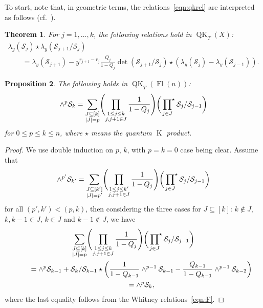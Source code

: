 \documentclass[pdftex]{sigma}
\numberwithin{equation}{section}
\newtheorem{Theorem}{Theorem}[section]
\newtheorem{Proposition}[Theorem]{Proposition}
\theoremstyle{definition}
\DeclareMathOperator{\Fl}{Fl}
\DeclareMathOperator{\QK}{QK}
\DeclareMathOperator{\K}{K}
\newcommand{\cS}{{\mathcal S}}
\begin{document}
To start, note that, in geometric terms, the relations~\eqref{eqn:qkrel} are interpreted as follows
(cf.~\cite{gu2023quantum,GMSXZZ:QKW,huq2024quantum}).

\begin{Theorem}%
 For $j=1,\dots, k$, the following relations hold in $\QK_T(X)$:
 \begin{gather}
 \lambda_y(\cS_{j})\star\lambda_y(\cS_{{j+1}}/\cS_{j})\nonumber\\
 \qquad{}=\lambda_y(\cS_{{j+1}})-y^{r_{j+1}-r_j}\frac{Q_j}{1-Q_j}\det(\cS_{{j+1}}/\cS_{j})\star(\lambda_y(\cS_{j})-\lambda_y(\cS_{{j-1}})).\label{eqn:lambda_y_rel}
 \end{gather}
\end{Theorem}
\begin{Proposition}\label{prop:F}
 The following holds in $\QK_T(\Fl(n))$:
 \begin{gather}\label{eqn:F}
 \wedge^{p}\cS_k =\sum_{\substack{J\subseteq[k]\\|J|=p}}\Biggl(\prod_{\substack{1\leq j\leq k\\j,j+1\in J}}\frac{1}{1-Q_j}\Biggr)\biggl(\sideset{}{^\star}\prod_{j\in J}\cS_{j}/\cS_{j-1}\biggr)
 \end{gather}
 for $0\leq p\leq k\leq n$, where $\star$ means the quantum $\K$ product.
\end{Proposition}
\begin{proof}
 We use double induction on $p$, $k$, with $p=k=0$ case being clear. Assume that
 \begin{gather*}
 \wedge^{p'}\cS_{k'} =\sum_{\substack{J\subseteq[k']\\|J|=p'}}\Biggl(\prod_{\substack{1\leq j\leq k'\\j,j+1\in J}}\frac{1}{1-Q_j}\Biggr)\biggl(\sideset{}{^\star}\prod_{j\in J}\cS_{j}/\cS_{j-1}\biggr)
 \end{gather*}
 for all $(p',k')<(p,k)$, then considering the three cases for $J\subseteq [k]$: $k\notin J$, $k,k-1\in J$, $k\in J$ and $k-1\notin J$, we have
 \begin{gather*}
 \sum_{\substack{J\subseteq[k]\\|J|=p}}\Biggl(\prod_{\substack{1\leq j\leq k\\j,j+1\in J}}\frac{1}{1-Q_j}\Biggr)\biggl(\sideset{}{^\star}\prod_{j\in J}\cS_{j}/\cS_{j-1}\biggr)\\
 \qquad{}=\wedge^p\cS_{k-1}+\cS_k/\cS_{k-1} \star \biggl(\frac{1}{1-Q_{k-1}}\wedge^{p-1}\cS_{k-1}-\frac{Q_{k-1}}{1-Q_{k-1}}\wedge^{p-1}\cS_{k-2}\biggr)\\
 \qquad{}= \wedge^p\cS_k,
 \end{gather*}
 where the last equality follows from the Whitney relations~\eqref{eqn:F}.
\end{proof}
\end{document}

